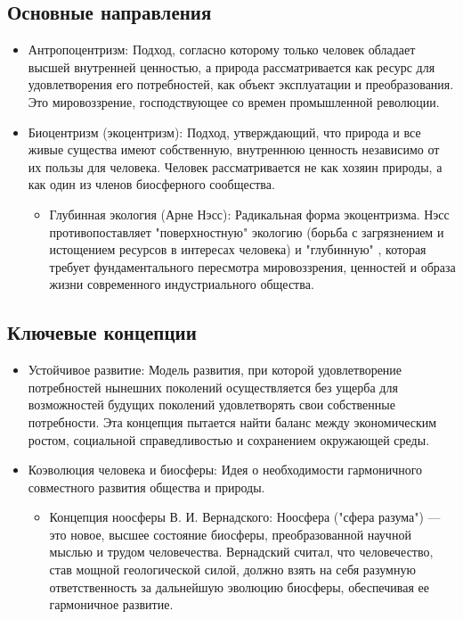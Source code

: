 \documentclass[12pt,a4paper]{article}
\begin{document}
	\subsection{Основные направления}
	\begin{itemize}
		\item Антропоцентризм: Подход, согласно которому только человек обладает высшей внутренней ценностью, а природа рассматривается как ресурс для удовлетворения его потребностей, как объект эксплуатации и преобразования. Это мировоззрение, господствующее со времен промышленной революции.
		\item Биоцентризм (экоцентризм): Подход, утверждающий, что природа и все живые существа имеют собственную, внутреннюю ценность независимо от их пользы для человека. Человек рассматривается не как хозяин природы, а как один из членов биосферного сообщества.
		\begin{itemize}
			\item Глубинная экология (Арне Нэсс): Радикальная форма экоцентризма. Нэсс противопоставляет "поверхностную" экологию (борьба с загрязнением и истощением ресурсов в интересах человека) и "глубинную" , которая требует фундаментального пересмотра мировоззрения, ценностей и образа жизни современного индустриального общества.
		\end{itemize}
	\end{itemize}
	
	\subsection{Ключевые концепции}
	\begin{itemize}
		\item Устойчивое развитие: Модель развития, при которой удовлетворение потребностей нынешних поколений осуществляется без ущерба для возможностей будущих поколений удовлетворять свои собственные потребности. Эта концепция пытается найти баланс между экономическим ростом, социальной справедливостью и сохранением окружающей среды.
		\item Коэволюция человека и биосферы: Идея о необходимости гармоничного совместного развития общества и природы.
		\begin{itemize}
			\item Концепция ноосферы В. И. Вернадского: Ноосфера ("сфера разума") --- это новое, высшее состояние биосферы, преобразованной научной мыслью и трудом человечества. Вернадский считал, что человечество, став мощной геологической силой, должно взять на себя разумную ответственность за дальнейшую эволюцию биосферы, обеспечивая ее гармоничное развитие.
		\end{itemize}
	\end{itemize}
	
\end{document}

